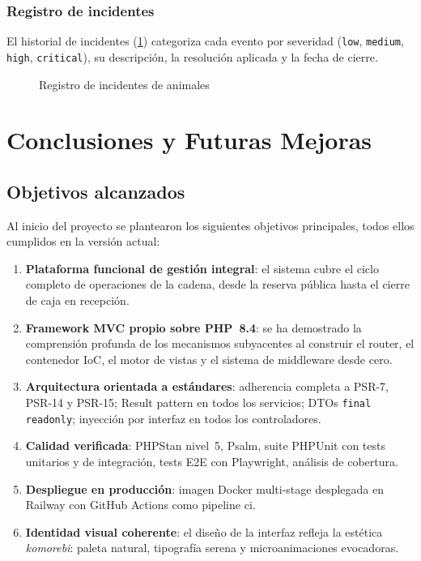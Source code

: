 \documentclass[12pt,a4paper,twoside,openright]{report}
\begin{document}
\subsection{Registro de incidentes}
El historial de incidentes (\cref{fig:62-keeper-incidents}) categoriza cada evento
por severidad (\texttt{low}, \texttt{medium}, \texttt{high}, \texttt{critical}),
su descripción, la resolución aplicada y la fecha de cierre.

\begin{figure}[H]
  \centering
  \fbox{\rule{0pt}{6cm}\rule{12cm}{0pt}}
  \caption{Registro de incidentes de animales}
  \label{fig:62-keeper-incidents}
\end{figure}

\chapter{Conclusiones y Futuras Mejoras}
\label{chap:conclusiones}

\section{Objetivos alcanzados}
\label{sec:objetivos-alcanzados}

Al inicio del proyecto se plantearon los siguientes objetivos principales, todos
ellos cumplidos en la versión actual:

\begin{enumerate}
  \item \textbf{Plataforma funcional de gestión integral}: el sistema cubre el ciclo
    completo de operaciones de la cadena, desde la reserva pública hasta el cierre
    de caja en recepción.
  \item \textbf{Framework MVC propio sobre PHP~8.4}: se ha demostrado la comprensión
    profunda de los mecanismos subyacentes al construir el router, el contenedor IoC,
    el motor de vistas y el sistema de middleware desde cero.
  \item \textbf{Arquitectura orientada a estándares}: adherencia completa a PSR-7,
    PSR-14 y PSR-15; Result pattern en todos los servicios; DTOs \texttt{final readonly};
    inyección por interfaz en todos los controladores.
  \item \textbf{Calidad verificada}: PHPStan nivel~5, Psalm, suite PHPUnit con tests
    unitarios y de integración, tests E2E con Playwright, análisis de cobertura.
  \item \textbf{Despliegue en producción}: imagen Docker multi-stage desplegada en
    Railway con GitHub Actions como pipeline \gls{ci}.
  \item \textbf{Identidad visual coherente}: el diseño de la interfaz refleja la
    estética \textit{komorebi}: paleta natural, tipografía serena y microanimaciones
    evocadoras.
\end{enumerate}
\end{document}
